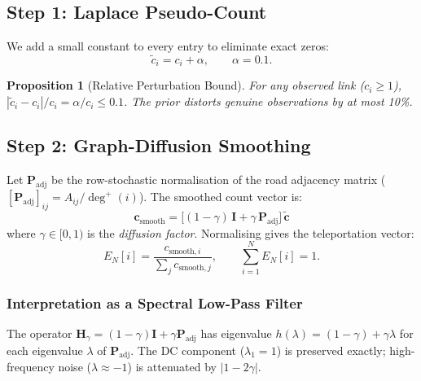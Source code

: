 \documentclass[12pt,a4paper]{article}
\theoremstyle{definition}
\theoremstyle{plain}
\newtheorem{proposition}{Proposition}[section]
\begin{document}
\subsection{Step 1: Laplace Pseudo-Count}
\label{sec:laplace}

We add a small constant to every entry to eliminate exact zeros:
\begin{equation}
  \tilde{c}_i = c_i + \alpha, \qquad \alpha = 0.1.
  \label{eq:laplace}
\end{equation}

\begin{proposition}[Relative Perturbation Bound]
  For any observed link ($c_i \geq 1$), $|\tilde{c}_i - c_i|/c_i = \alpha/c_i \leq 0.1$.
  The prior distorts genuine observations by at most 10\%.
\end{proposition}

\subsection{Step 2: Graph-Diffusion Smoothing}
\label{sec:diffusion}

Let $\mathbf{P}_{\mathrm{adj}}$ be the row-stochastic normalisation of the road
adjacency matrix ($[\mathbf{P}_{\mathrm{adj}}]_{ij} = A_{ij}/\deg^+(i)$). The smoothed
count vector is:
\begin{equation}
  \boxed{
  \mathbf{c}_{\mathrm{smooth}} =
  \bigl[(1-\gamma)\,\mathbf{I} + \gamma\,\mathbf{P}_{\mathrm{adj}}\bigr]\,\tilde{\mathbf{c}}
  }
  \label{eq:smoothing}
\end{equation}
where $\gamma \in [0,1)$ is the \emph{diffusion factor}. Normalising gives the
teleportation vector:
\begin{equation}
  E_N[i] = \frac{c_{\mathrm{smooth},i}}{\sum_j c_{\mathrm{smooth},j}}, \qquad
  \sum_{i=1}^N E_N[i] = 1.
  \label{eq:EN}
\end{equation}

\subsubsection{Interpretation as a Spectral Low-Pass Filter}

The operator $\mathbf{H}_\gamma = (1-\gamma)\mathbf{I} + \gamma\mathbf{P}_{\mathrm{adj}}$
has eigenvalue $h(\lambda) = (1-\gamma)+\gamma\lambda$ for each eigenvalue $\lambda$
of $\mathbf{P}_{\mathrm{adj}}$. The DC component ($\lambda_1=1$) is preserved exactly;
high-frequency noise ($\lambda \approx -1$) is attenuated by $|1-2\gamma|$.
\end{document}
